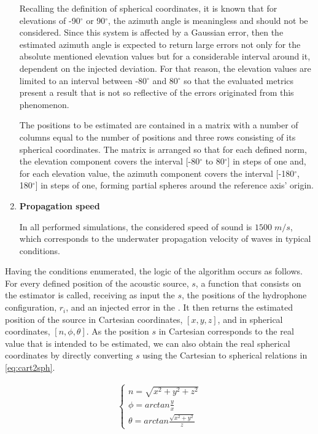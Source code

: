 \begin{enumerate}[label=\alph*)]
	Recalling the definition of spherical coordinates, it is known that for elevations of -90$^{\circ}$ or 90$^{\circ}$, the azimuth angle is meaningless and should not be considered. Since this system is affected by a Gaussian error, then the estimated azimuth angle is expected to return large errors not only for the absolute mentioned elevation values but for a considerable interval around it, dependent on the injected deviation. For that reason, the elevation values are limited to an interval between -80$^{\circ}$ and 80$^{\circ}$ so that the evaluated metrics present a result that is not so reflective of the errors originated from this phenomenon.
	
	The positions to be estimated are contained in a matrix with a number of columns equal to the number of positions and three rows consisting of its spherical coordinates. The matrix is arranged so that for each defined norm, the elevation component covers the interval [-80$^{\circ}$ to 80$^{\circ}$] in steps of one and, for each elevation value, the azimuth component covers the interval [-180$^{\circ}$, 180$^{\circ}$] in steps of one, forming partial spheres around the reference axis' origin.
	
	\item \textbf{Propagation speed}
	
	In all performed simulations, the considered speed of sound is $1500 \; m/s$, which corresponds to the underwater propagation velocity of waves in typical conditions.
	
\end{enumerate}

Having the conditions enumerated, the logic of the algorithm occurs as follows. For every defined position of the acoustic source, $s$, a function that consists on the estimator is called, receiving as input the $s$, the positions of the hydrophone configuration, $r_i$, and an injected error in the . It then returns the estimated position of the source in Cartesian coordinates, $[x,y,z]$, and in spherical coordinates, $[n, \phi, \theta]$. As the position $s$ in Cartesian corresponds to the real value that is intended to be estimated, we can also obtain the real spherical coordinates by directly converting $s$ using the Cartesian to spherical relations in \ref{eq:cart2sph}.

\begin{eqnarray}
	\begin{cases} 
		n =  \sqrt{x^2 + y^2 + z^2}\\ 
		\phi  = arctan \frac{y}{x}\\ 
		\theta =  arctan \frac{\sqrt{x^2+y^2}}{z}
	\end{cases}
	\label{eq:cart2sph}
\end{eqnarray}


